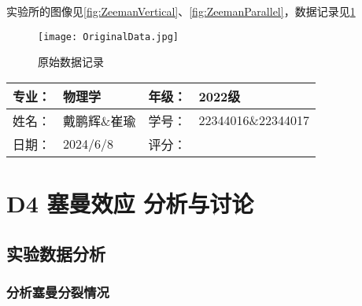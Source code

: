 \documentclass[dvipsnames, svgnames,a4paper,11pt]{article}
\begin{document}
	实验所的图像见\cref{fig:ZeemanVertical}、\cref{fig:ZeemanParallel}，数据记录见\cref{fig:data}

	\begin{figure}[htbp]
		\centering
		{\texttt{[image: OriginalData.jpg]}\label{fig:OriginalData}}
		\quad

		\caption{原始数据记录}
		\label{fig:data}
	\end{figure}





	





\clearpage
\begin{table}
	\renewcommand\arraystretch{1.7}
	\begin{tabularx}{\textwidth}{|X|X|X|X|}
	\hline
	专业：& 物理学 &年级：& 2022级\\
	\hline
	姓名： & 戴鹏辉\&崔瑜 & 学号：& 22344016\&22344017\\
	\hline
    日期：& 2024/6/8 & 评分： &\\
	\hline
	\end{tabularx}
\end{table}

\section{D4 \quad 塞曼效应 \quad\heiti 分析与讨论}

\subsection{实验数据分析}

	\subsubsection{分析塞曼分裂情况}
\end{document}
